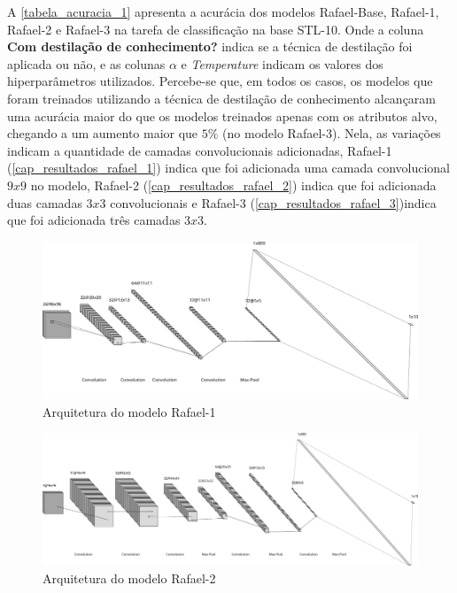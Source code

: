 A \autoref{tabela_acuracia_1} apresenta a acurácia dos modelos Rafael-Base, Rafael-1, Rafael-2 e Rafael-3 na tarefa de
classificação na base STL-10.
Onde a coluna \textbf{Com destilação de conhecimento?} indica se a técnica de destilação foi aplicada
ou não, e as colunas $\alpha$ e \textit{Temperature} indicam os valores dos hiperparâmetros utilizados.
Percebe-se que, em todos os casos, os modelos que foram treinados utilizando a técnica de destilação de conhecimento alcançaram
uma acurácia maior do que os modelos treinados apenas com os atributos alvo, chegando a um aumento maior que $5\%$ (no modelo
Rafael-3).
Nela, as variações indicam a quantidade de camadas convolucionais adicionadas, Rafael-1
(\autoref{cap_resultados_rafael_1}) indica que foi adicionada uma camada convolucional $9x9$ no modelo, Rafael-2
(\autoref{cap_resultados_rafael_2}) indica que foi adicionada duas camadas $3x3$ convolucionais e Rafael-3
(\autoref{cap_resultados_rafael_3})indica que foi adicionada três camadas $3x3$.

\begin{figure}
	\caption {\label{cap_resultados_rafael_1}Arquitetura do modelo Rafael-1}
	\begin{center}
		\includegraphics[scale=0.50]{Imagens/arch-rafael-1}
	\end{center}
\end{figure}

\begin{figure}
	\caption {\label{cap_resultados_rafael_2}Arquitetura do modelo Rafael-2}
	\begin{center}
		\includegraphics[scale=0.50]{Imagens/arch-rafael-2}
	\end{center}
\end{figure}

